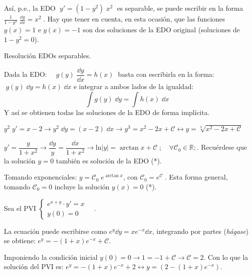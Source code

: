 Así, p.e., la EDO $\; y'=(1-y^2)\; x^2\; $ es separable, se puede escribir en la forma $\frac 1 {1-y^2}\; \frac {\dd y}{\dd x}= x^2\;$. Hay que tener en cuenta, en esta ocasión, que las funciones $y(x)=1$ e $y(x)=-1$ son dos soluciones de la EDO original (soluciones de $1-y^2=0$).

\begin{teor}{Resolución EDOs separables.}

	Dada la EDO: $\displaystyle \quad  g(y)\; \dfrac {\dd y}{\dd x}=h(x)\; $ basta con escribirla en la forma: $\; g(y)\; \dd y = h(x)\; \dd x$ e integrar a ambos lados de la igualdad:
	\begin{equation*}
		\boxed{\; \int g(y)\; \dd y = \int h(x)\; \dd x\; }
	\end{equation*}
	Y así se obtienen todas las soluciones de la EDO de forma implícita.
\end{teor}

\begin{ejem}
$y^2\; y'=x-2 \to y^2\; \dd y = (x-2) \; \dd x \to y^3=x^2-2x+\mathcal C \leftrightarrow y=\sqrt[3]{x^2-2x+\mathcal C}$	
\end{ejem}

\begin{ejem}
$y'=\dfrac {y}{1+x^2} \to \dfrac {\dd y}{y} = \dfrac {\dd x}{1 + x^2} \to \mathrm{ln}|y|=\arctan x + \mathcal C\; ; \quad  \forall \mathcal C_0 \in \mathbb R; $.
Recuérdese que la solución $y=0$ también es solución de la EDO (*).

Tomando exponenciales: $y=\mathcal C_0\; e^{\arctan x}$, con $ 	\mathcal C_0=e^{\mathcal C} \;$. Esta forma general, tomando $\mathcal C_0=0$ incluye la solución $y(x)=0$ (*). 
\end{ejem}

\begin{ejem}
Sea el PVI $\begin{cases} e^{x+y} \cdot  y'= x \\ y(0)=0 \end{cases}\quad$. 

La ecuación puede escribirse como $e^y\dd y=xe^{-x}\dd x$, integrando por partes (\emph{hágase}) se obtiene: $e^y=-(1+x)e^{-x}+\mathcal C$.

Imponiendo la condición inicial $y(0)=0 \to 1=-1+\mathcal C \to \mathcal C=2$. Con lo que la solución del PVI es: $e^y=-(1+x)e^{-x}+2 \leftrightarrow y=\left(2-(1+x)e^{-x}\right)$.
	
\end{ejem}

